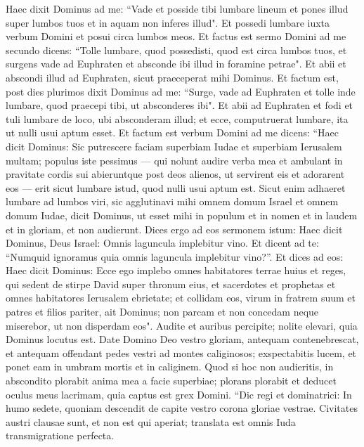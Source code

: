 \begin{biblechapter}  
\verse Haec dixit Dominus ad me: “Vade et posside tibi lumbare lineum et pones illud super lumbos tuos et in aquam non inferes illud". 
\verse Et possedi lumbare iuxta verbum Domini et posui circa lumbos meos. 
\verse Et factus est sermo Domini ad me secundo dicens: 
\verse “Tolle lumbare, quod possedisti, quod est circa lumbos tuos, et surgens vade ad Euphraten et absconde ibi illud in foramine petrae". 
\verse Et abii et abscondi illud ad Euphraten, sicut praeceperat mihi Dominus. 
\verse Et factum est, post dies plurimos dixit Dominus ad me: “Surge, vade ad Euphraten et tolle inde lumbare, quod praecepi tibi, ut absconderes ibi". 
\verse Et abii ad Euphraten et fodi et tuli lumbare de loco, ubi absconderam illud; et ecce, computruerat lumbare, ita ut nulli usui aptum esset. 
\verse Et factum est verbum Domini ad me dicens: 
\verse “Haec dicit Dominus: Sic putrescere faciam superbiam Iudae et superbiam Ierusalem multam; 
\verse populus iste pessimus — qui nolunt audire verba mea et ambulant in pravitate cordis sui abieruntque post deos alienos, ut servirent eis et adorarent eos — erit sicut lumbare istud, quod nulli usui aptum est. 
\verse Sicut enim adhaeret lumbare ad lumbos viri, sic agglutinavi mihi omnem domum Israel et omnem domum Iudae, dicit Dominus, ut esset mihi in populum et in nomen et in laudem et in gloriam, et non audierunt. 
\verse Dices ergo ad eos sermonem istum: Haec dicit Dominus, Deus Israel: Omnis laguncula implebitur vino. Et dicent ad te: “Numquid ignoramus quia omnis laguncula implebitur vino?”. 
\verse Et dices ad eos: Haec dicit Dominus: Ecce ego implebo omnes habitatores terrae huius et reges, qui sedent de stirpe David super thronum eius, et sacerdotes et prophetas et omnes habitatores Ierusalem ebrietate; 
\verse et collidam eos, virum in fratrem suum et patres et filios pariter, ait Dominus; non parcam et non concedam neque miserebor, ut non disperdam eos". 
\verse Audite et auribus percipite; nolite elevari, quia Dominus locutus est. 
\verse Date Domino Deo vestro gloriam, antequam contenebrescat, et antequam offendant pedes vestri ad montes caliginosos; exspectabitis lucem, et ponet eam in umbram mortis et in caliginem. 
\verse Quod si hoc non audieritis, in abscondito plorabit anima mea a facie superbiae; plorans plorabit et deducet oculus meus lacrimam, quia captus est grex Domini. 
\verse “Dic regi et dominatrici: In humo sedete, quoniam descendit de capite vestro corona gloriae vestrae. 
\verse Civitates austri clausae sunt, et non est qui aperiat; translata est omnis Iuda transmigratione perfecta. 

\end{biblechapter}
